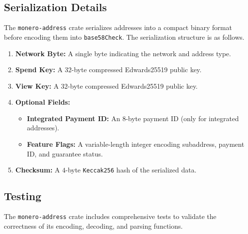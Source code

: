 \documentclass[12pt,a4paper]{article}
\begin{document}
\subsection{Serialization Details}

The \texttt{monero-address} crate serializes addresses into a compact binary format before encoding them into \texttt{base58Check}.  The serialization structure is as follows. %

\begin{enumerate}
    \item \textbf{Network Byte:} A single byte indicating the network and address type.
    \item \textbf{Spend Key:} A $32$-byte compressed Edwards25519 public key.
    \item \textbf{View Key:} A $32$-byte compressed Edwards25519 public key.
    \item \textbf{Optional Fields:}
    \begin{itemize}
        \item \textbf{Integrated Payment ID:} An $8$-byte payment ID (only for integrated addresses).
        \item \textbf{Feature Flags:} A variable-length integer encoding subaddress, payment ID, and guarantee status.
    \end{itemize}
    \item \textbf{Checksum:} A $4$-byte \texttt{Keccak256} hash of the serialized data.
\end{enumerate}

\subsection{Testing}

The \texttt{monero-address} crate includes comprehensive tests to validate the correctness of its encoding, decoding, and parsing functions. %
\end{document}
